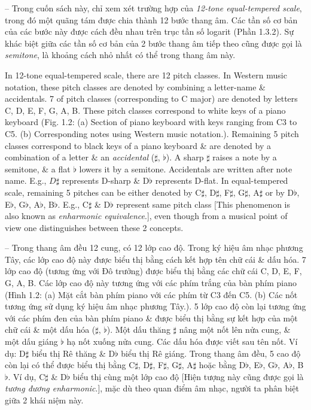 \documentclass{article}
\begin{document}
\begin{itemize}
\begin{itemize}
\begin{itemize}
			-- Trong cuốn sách này, chỉ xem xét trường hợp của {\it12-tone equal-tempered scale}, trong đó một quãng tám được chia thành 12 bước thang âm. Các tần số cơ bản của các bước này được cách đều nhau trên trục tần số logarit (Phần 1.3.2). Sự khác biệt giữa các tần số cơ bản của 2 bước thang âm tiếp theo cũng được gọi là {\it semitone}, là khoảng cách nhỏ nhất có thể trong thang âm này.
			
			In 12-tone equal-tempered scale, there are 12 pitch classes. In Western music notation, these pitch classes are denoted by combining a letter-name \& accidentals. 7 of pitch classes (corresponding to C major) are denoted by letters C, D, E, F, G, A, B. These pitch classes correspond to white keys of a piano keyboard ({\sf Fig. 1.2: (a) Section of piano keyboard with keys ranging from C3 to C5. (b) Corresponding notes using Western music notation.}). Remaining 5 pitch classes correspond to black keys of a piano keyboard \& are denoted by a combination of a letter \& an {\it accidental} ($\sharp$, $\flat$). A sharp $\sharp$ raises a note by a semitone, \& a flat $\flat$ lowers it by a semitone. Accidentals are written after note name. E.g., $D\sharp$ represents D-sharp \& D$\flat$ represents D-flat. In equal-tempered scale, remaining 5 pitches can be either denoted by C$\sharp$, D$\sharp$, F$\sharp$, G$\sharp$, A$\sharp$ or by D$\flat$, E$\flat$, G$\flat$, A$\flat$, B$\flat$. E.g., C$\sharp$ \& D$\flat$ represent same pitch class [This phenomenon is also known as {\it enharmonic equivalence}.], even though from a musical point of view one distinguishes between these 2 concepts.
			
			-- Trong thang âm đều 12 cung, có 12 lớp cao độ. Trong ký hiệu âm nhạc phương Tây, các lớp cao độ này được biểu thị bằng cách kết hợp tên chữ cái \& dấu hóa. 7 lớp cao độ (tương ứng với Đô trưởng) được biểu thị bằng các chữ cái C, D, E, F, G, A, B. Các lớp cao độ này tương ứng với các phím trắng của bàn phím piano ({\sf Hình 1.2: (a) Mặt cắt bàn phím piano với các phím từ C3 đến C5. (b) Các nốt tương ứng sử dụng ký hiệu âm nhạc phương Tây.}). 5 lớp cao độ còn lại tương ứng với các phím đen của bàn phím piano \& được biểu thị bằng sự kết hợp của một chữ cái \& một dấu hóa {\it} ($\sharp$, $\flat$). Một dấu thăng $\sharp$ nâng một nốt lên nửa cung, \& một dấu giáng $\flat$ hạ nốt xuống nửa cung. Các dấu hóa được viết sau tên nốt. Ví dụ: D$\sharp$ biểu thị Rê thăng \& D$\flat$ biểu thị Rê giáng. Trong thang âm đều, 5 cao độ còn lại có thể được biểu thị bằng C$\sharp$, D$\sharp$, F$\sharp$, G$\sharp$, A$\sharp$ hoặc bằng D$\flat$, E$\flat$, G$\flat$, A$\flat$, B$\flat$. Ví dụ, C$\sharp$ \& D$\flat$ biểu thị cùng một lớp cao độ [Hiện tượng này cũng được gọi là {\it tương đương enharmonic}.], mặc dù theo quan điểm âm nhạc, người ta phân biệt giữa 2 khái niệm này.
			

\end{itemize}
\end{itemize}
\end{itemize}
\end{document}
